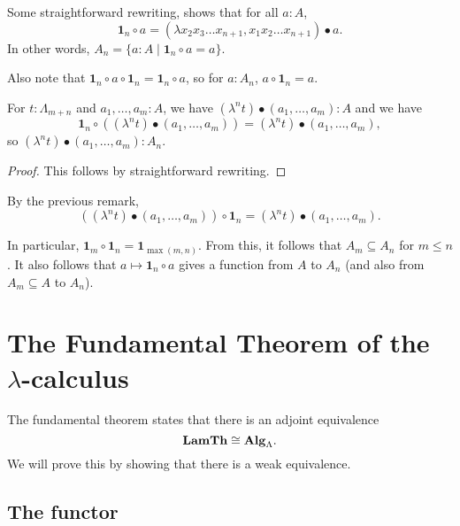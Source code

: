 \begin{remark}
  Some straightforward rewriting, shows that for all $ a : A $,
  \[ \mathbf 1_n \circ a = (\lambda x_2 x_3 \dots x_{n + 1}, x_1 x_2 \dots x_{n + 1}) \bullet a. \]
  In other words, $ A_n = \{ a : A \mid \mathbf 1_n \circ a = a \} $.
\end{remark}

\begin{remark}
  Also note that $ \mathbf 1_n \circ a \circ \mathbf 1_n = \mathbf 1_n \circ a $, so for $ a : A_n $, $ a \circ \mathbf 1_n = a $.
\end{remark}

\begin{lemma}
  For $ t: \Lambda_{m + n} $ and $ a_1, \dots, a_m: A $, we have $ (\lambda^n t) \bullet (a_1, \dots, a_m) : A $ and we have
  \[ \mathbf 1_n \circ ((\lambda^n t) \bullet (a_1, \dots, a_m)) = (\lambda^n t) \bullet (a_1, \dots, a_m), \]
  so $ (\lambda^n t) \bullet (a_1, \dots, a_m) : A_n $.
\end{lemma}
\begin{proof}
  This follows by straightforward rewriting.
\end{proof}

\begin{corollary}
  By the previous remark,
  \[ ((\lambda^n t) \bullet (a_1, \dots, a_m)) \circ \mathbf 1_n = (\lambda^n t) \bullet (a_1, \dots, a_m). \]
\end{corollary}
\begin{corollary}
  In particular, $ \mathbf 1_m \circ \mathbf 1_n = \mathbf 1_{\max(m, n)} $. From this, it follows that $ A_m \subseteq A_n $ for $ m \leq n $. It also follows that $ a \mapsto \mathbf 1_n \circ a $ gives a function from $ A $ to $ A_n $ (and also from $ A_m \subseteq A $ to $ A_n $).
\end{corollary}


\section{The Fundamental Theorem of the \texorpdfstring{$ \lambda $-}{lambda }calculus}

The fundamental theorem states that there is an adjoint equivalence
\[ \mathbf{LamTh} \cong \mathbf{Alg}_{\Lambda}. \]
We will prove this by showing that there is a weak equivalence.


\subsection{The functor}

